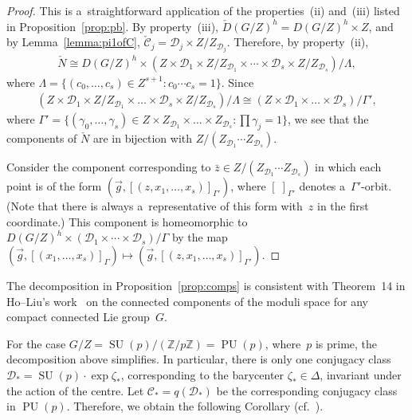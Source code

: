 \documentclass[pdftex]{sigma}
\numberwithin{equation}{section}
\DeclareMathOperator{\SU}{SU}
\DeclareMathOperator{\PU}{PU}
\begin{document}
\begin{proof}
This is a~straightforward application of the properties~(ii) %
and~(iii) %
listed in Proposition~\ref{prop:pb}.
By property~(iii), $\check{D}(G/Z)^h = D(G/Z)^h \times Z$, and by Lemma~\ref{lemma:pi1ofC},
$\check{\mathcal{C}}_j = \mathcal{D}_j \times Z/Z_{\mathcal{D}_j}$.
Therefore, by property~(ii),
\begin{gather*}
\check{N} \cong D(G/Z)^h \times (Z\times \mathcal{D}_1 \times Z/Z_{\mathcal{D}_1} \times \cdots \times \mathcal{D}_s
\times Z/Z_{\mathcal{D}_s})/\Lambda,
\end{gather*}
where $\Lambda={\{(c_0, \ldots, c_{s}) \in Z^{s+1} \colon c_0 \cdots c_{s}=1\}}$.
Since
\begin{gather*}
(Z\times \mathcal{D}_1 \times Z/Z_{\mathcal{D}_1} \times \dots \times \mathcal{D}_s \times Z/Z_{\mathcal{D}_s})/\Lambda
\cong (Z\times \mathcal{D}_1 \times \dots \times \mathcal{D}_s)/\Gamma',
\end{gather*}
where $\Gamma'=\{(\gamma_0, \ldots, \gamma_{s}) \in Z\times Z_{\mathcal{D}_1} \times \dots \times Z_{\mathcal{D}_s}
\colon \prod \gamma_j =1\}$, we see that the components of $\check{N}$ are in bijection with $Z/(Z_{\mathcal{D}_1} \cdots
Z_{\mathcal{D}_s})$.

Consider the component corresponding to $\bar{z} \in Z/(Z_{\mathcal{D}_1}\cdots Z_{\mathcal{D}_s})$ in which each point
is of the form $(\vec{g},[(z,x_1, \ldots, x_s)]_{\Gamma'})$, where $[\;]_{\Gamma'}$
denotes a~$\Gamma'$-orbit.
(Note that there is always a~representative of this form with~$z$ in the f\/irst coordinate.) This component is
homeomorphic to $D(G/Z)^h \times (\mathcal{D}_1 \times \cdots \times \mathcal{D}_s)/\Gamma$ by the map $(\vec{g},[(x_1, \ldots,
x_s)]_{\Gamma}) \mapsto (\vec{g},[(z,x_1, \ldots, x_s)]_{\Gamma'})$.
\end{proof}

\begin{Remark}
The decomposition in Proposition~\ref{prop:comps} is consistent with Theorem~14 in Ho--Liu's work~\cite{HL} on the
connected components of the moduli space for any compact connected Lie group~$G$.
\end{Remark}

For the case $G/Z=\SU(p)/({\mathbb{Z}}/p{\mathbb{Z}})=\PU(p)$, where~$p$ is prime, the decomposition above simplif\/ies.
In particular, there is only one conjugacy class $\mathcal{D}_*=\SU(p) \cdot \exp \zeta_*$, corresponding to the
barycenter $\zeta_* \in \Delta$, invariant under the action of the centre.
Let $\mathcal{C}_*=q(\mathcal{D}_*)$ be the corresponding conjugacy class in $\PU(p)$.
Therefore, we obtain the following Corollary (cf.~\cite[Lemma 2.3]{KM}).
\end{document}
